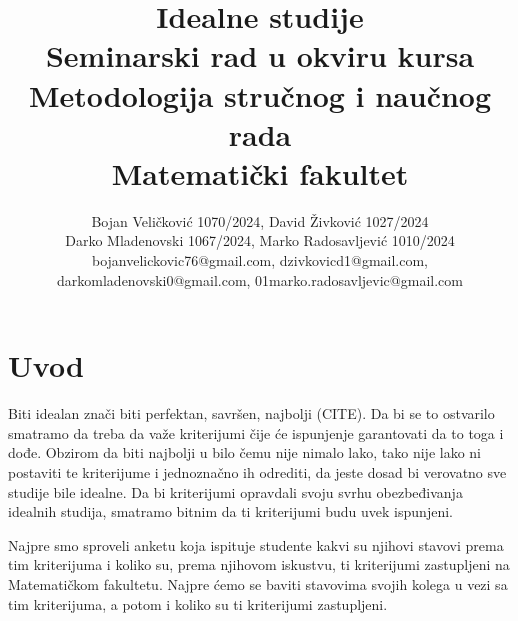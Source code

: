 \documentclass[a4paper]{article}
\begin{document}
\title{Idealne studije\\ \small{Seminarski rad u okviru kursa\\Metodologija stručnog i naučnog rada\\ Matematički fakultet}}

\author{Bojan Veličković 1070/2024, David Živković 1027/2024\\ Darko Mladenovski 1067/2024, Marko Radosavljević 1010/2024\\bojanvelickovic76@gmail.com, dzivkovicd1@gmail.com,\\ darkomladenovski0@gmail.com, 01marko.radosavljevic@gmail.com}



\maketitle


\tableofcontents

\newpage

\section{Uvod}
\label{sec:uvod}

Biti idealan znači biti perfektan, savršen, najbolji (CITE). Da bi se to ostvarilo smatramo da treba da važe kriterijumi čije će ispunjenje garantovati da to toga i dođe. Obzirom da biti najbolji u bilo čemu nije nimalo lako, tako nije lako ni postaviti te kriterijume i jednoznačno ih odrediti, da jeste dosad bi verovatno sve studije bile idealne. Da bi kriterijumi opravdali svoju svrhu obezbeđivanja idealnih studija, smatramo bitnim da ti kriterijumi budu uvek ispunjeni.

Najpre smo sproveli anketu koja ispituje studente kakvi su njihovi stavovi prema tim kriterijuma i koliko su, prema njihovom iskustvu, ti kriterijumi zastupljeni na Matematičkom fakultetu. Najpre ćemo se baviti stavovima svojih kolega u vezi sa tim kriterijuma, a potom i koliko su ti kriterijumi zastupljeni.
\end{document}
